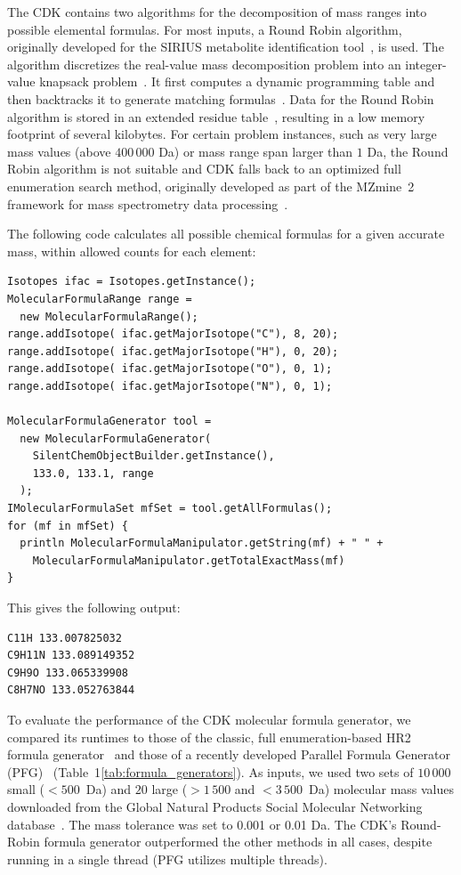 \documentclass[10pt]{bmcart}
\begin{document}
  The CDK contains two algorithms for the decomposition of mass ranges into
possible elemental formulas. For most inputs, a Round Robin algorithm,
originally developed for the SIRIUS metabolite identification
tool~\cite{Bocker2009}, is used. The algorithm discretizes the real-value mass
decomposition problem into an integer-value knapsack
problem~\cite{Martello1990}. It first computes a dynamic programming table and
then backtracks it to generate matching formulas~\cite{Duehrkop2013,
Boecker2008}. Data for the Round Robin algorithm is stored in an extended
residue table~\cite{Bocker2005}, resulting in a low memory footprint of several
kilobytes. For certain problem instances, such as very large mass values (above
$400\,000$ Da) or mass range span larger than $1$ Da, the Round Robin algorithm
is not suitable and CDK falls back to an optimized full enumeration search
method, originally developed as part of the MZmine~2 framework for mass
spectrometry data processing~\cite{Pluskal2012, Pluskal2010}.

  The following code calculates all possible chemical formulas for a given
accurate mass, within allowed counts for each element:

\begin{verbatim}
Isotopes ifac = Isotopes.getInstance();
MolecularFormulaRange range =
  new MolecularFormulaRange();
range.addIsotope( ifac.getMajorIsotope("C"), 8, 20);
range.addIsotope( ifac.getMajorIsotope("H"), 0, 20);
range.addIsotope( ifac.getMajorIsotope("O"), 0, 1);
range.addIsotope( ifac.getMajorIsotope("N"), 0, 1);

MolecularFormulaGenerator tool =
  new MolecularFormulaGenerator(
    SilentChemObjectBuilder.getInstance(),
    133.0, 133.1, range
  );
IMolecularFormulaSet mfSet = tool.getAllFormulas();
for (mf in mfSet) {
  println MolecularFormulaManipulator.getString(mf) + " " +
    MolecularFormulaManipulator.getTotalExactMass(mf)
}
\end{verbatim}

This gives the following output:

\begin{verbatim}
C11H 133.007825032
C9H11N 133.089149352
C9H9O 133.065339908
C8H7NO 133.052763844
\end{verbatim}

   To evaluate the performance of the CDK molecular formula generator, we
compared its runtimes to those of the classic, full enumeration-based HR2
formula generator~\cite{Kind2007} and those of a recently developed Parallel
Formula Generator (PFG)~\cite{Zhang2016} (Table~1\ref{tab:formula_generators}).
As inputs, we used two sets of $10\,000$ small ($< 500$~Da) and $20$ large ($>
1\,500$ and $< 3\,500$~Da) molecular mass values downloaded from the Global
Natural Products Social Molecular Networking database~\cite{wang2016}. The mass
tolerance was set to 0.001 or 0.01 Da. The CDK's Round-Robin formula generator
outperformed the other methods in all cases, despite running in a single thread
(PFG utilizes multiple threads).
\end{document}
